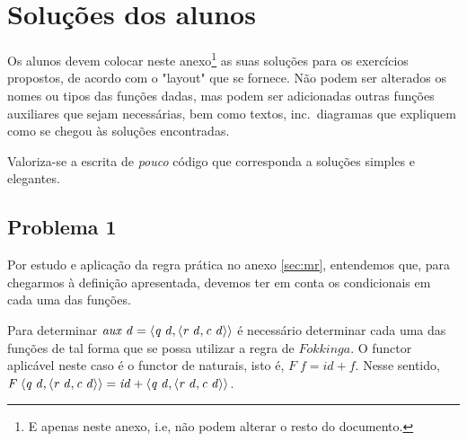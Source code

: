 \documentclass[a4paper]{article}
\newcommand{\Conid}[1]{\mathit{#1}}
\newcommand{\Varid}[1]{\mathit{#1}}
\begin{document}
\section{Soluções dos alunos}\label{sec:resolucao}

Os alunos devem colocar neste anexo\footnote{E apenas neste anexo,
i.e, não podem alterar o resto do documento.} as suas soluções para os
exercícios propostos, de acordo com o "layout" que se fornece. Não podem
ser alterados os nomes ou tipos das funções dadas, mas podem ser adicionadas
outras funções auxiliares que sejam necessárias, bem como 
textos, inc.\ diagramas que expliquem como se chegou às soluções encontradas.

Valoriza-se a escrita de \emph{pouco} código que corresponda a soluções
simples e elegantes.

\subsection*{Problema 1} \label{pg:P1}

Por estudo e aplicação da regra prática no anexo \ref{sec:mr}, entendemos que, 
para chegarmos à definição apresentada, devemos ter em conta os condicionais em cada uma das funções.

Para determinar \ensuremath{\Varid{aux}\;\Varid{d}\mathrel{=}\conj{\Varid{q}\;\Varid{d}}{\conj{\Varid{r}\;\Varid{d}}{\Varid{c}\;\Varid{d}}}} é necessário determinar cada uma das funções
de tal forma que se possa utilizar a regra de \ensuremath{\Conid{Fokkinga}}. O functor aplicável neste caso é o functor de naturais,
isto é, \ensuremath{\Conid{F}\;\Varid{f}\mathrel{=}\Varid{id}\mathbin{+}\Varid{f}}. Nesse sentido, \ensuremath{\Conid{F}\;\conj{\Varid{q}\;\Varid{d}}{\conj{\Varid{r}\;\Varid{d}}{\Varid{c}\;\Varid{d}}}\mathrel{=}\Varid{id}\mathbin{+}\conj{\Varid{q}\;\Varid{d}}{\conj{\Varid{r}\;\Varid{d}}{\Varid{c}\;\Varid{d}}}}.
\end{document}
